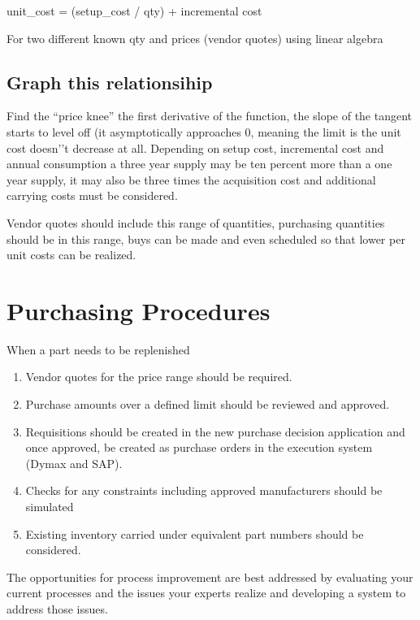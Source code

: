 \documentclass[letterpaper,10pt,english]{sphinxmanual}
\begin{document}
unit\_cost = (setup\_cost / qty) + incremental cost

For two different known qty and prices (vendor quotes) using linear
algebra


\subsection{Graph this relationsihip}
\label{\detokenize{BusinessProcessReengineering:graph-this-relationsihip}}
Find the “price knee” the first derivative of the function, the slope of
the tangent starts to level off (it asymptotically approaches 0, meaning
the limit is the unit cost doesn’’t decrease at all. Depending on setup
cost, incremental cost and annual consumption a three year supply may be
ten percent more than a one year supply, it may also be three times the
acquisition cost and additional carrying costs must be considered.

Vendor quotes should include this range of quantities, purchasing
quantities should be in this range, buys can be made and even scheduled
so that lower per unit costs can be realized.


\section{Purchasing Procedures}
\label{\detokenize{BusinessProcessReengineering:purchasing-procedures}}
When a part needs to be replenished
\begin{enumerate}
%
\item {} 
Vendor quotes for the price range should be required.

\item {} 
Purchase amounts over a defined limit should be reviewed and
approved.

\item {} 
Requisitions should be created in the new purchase decision
application and once approved, be created as purchase orders in the
execution system (Dymax and SAP).

\item {} 
Checks for any constraints including approved manufacturers should be
simulated

\item {} 
Existing inventory carried under equivalent part numbers should be
considered.

\end{enumerate}

The opportunities for process improvement are best addressed by
evaluating your current processes and the issues your experts realize
and developing a system to address those issues.
\end{document}
